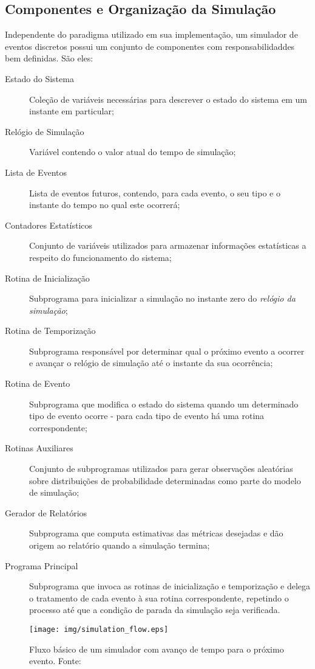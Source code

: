 \subsection{Componentes e Organização da Simulação}

Independente do paradigma utilizado em sua implementação, um simulador de
eventos discretos possui um conjunto de componentes com responsabilidaddes bem
definidas. São eles:

\begin{description}
\item[Estado do Sistema] Coleção de variáveis necessárias para descrever o estado do sistema em um instante em particular;
\item[Relógio de Simulação] Variável contendo o valor atual do tempo de simulação;
\item[Lista de Eventos] Lista de eventos futuros, contendo, para cada evento, o
seu tipo e o instante do tempo no qual este ocorrerá;
\item[Contadores Estatísticos] Conjunto de variáveis utilizados para armazenar informações estatísticas a respeito do funcionamento do sistema;
\item[Rotina de Inicialização] Subprograma para inicializar a simulação no
instante zero do \textit{relógio da simulação};
\item[Rotina de Temporização] Subprograma responsável por determinar qual o
próximo evento a ocorrer e avançar o relógio de simulação até o instante da sua
ocorrência;
\item[Rotina de Evento] Subprograma que modifica o estado do sistema quando um determinado tipo de evento ocorre - para cada tipo de evento há uma rotina
correspondente;
\item[Rotinas Auxiliares] Conjunto de subprogramas utilizados para gerar observações aleatórias sobre distribuições de probabilidade determinadas como parte do modelo de simulação;
\item[Gerador de Relatórios] Subprograma que computa estimativas das métricas desejadas e dão origem ao relatório quando a simulação termina;
\item[Programa Principal] Subprograma que invoca as rotinas de inicialização e temporização e delega o tratamento de cada evento à sua rotina correspondente, repetindo o processo até que a condição de parada da simulação seja verificada.
\end{description}

\begin{figure}[htb!]
\centering\texttt{[image: img/simulation\_flow.eps]}
\caption{\label{fig:simflow}Fluxo básico de um simulador com avanço de tempo para o próximo evento. Fonte:~\cite{Law}}
\end{figure}

